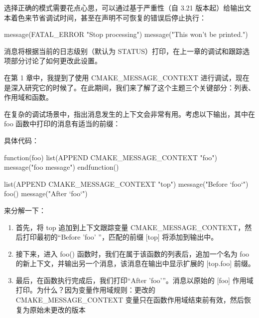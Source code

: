 选择正确的模式需要花点心思，可以通过基于严重性（自 3.21 版本起）给输出文本着色来节省调试时间，甚至在声明不可恢复的错误后停止执行：


\begin{cmake}
message(FATAL_ERROR "Stop processing")
message("This won't be printed.")
\end{cmake}

消息将根据当前的日志级别（默认为 STATUS）打印，在上一章的调试和跟踪选项部分讨论了如何更改此设置。

在第 1 章中，我提到了使用 CMAKE\_MESSAGE\_CONTEXT 进行调试，现在是深入研究它的时候了。在此期间，我们来了解了这个主题三个关键部分：列表、作用域和函数。

在复杂的调试场景中，指出消息发生的上下文会非常有用。考虑以下输出，其中在 foo 函数中打印的消息有适当的前缀：


具体代码：


\begin{cmake}
function(foo)
    list(APPEND CMAKE_MESSAGE_CONTEXT "foo")
    message("foo message")
endfunction()

list(APPEND CMAKE_MESSAGE_CONTEXT "top")
message("Before `foo`")
foo()
message("After `foo`")
\end{cmake}

来分解一下：

\begin{enumerate}
\item
首先，将 top 追加到上下文跟踪变量 CMAKE\_MESSAGE\_CONTEXT，然后打印最初的“Before 'foo' ”，匹配的前缀 [top] 将添加到输出中。

\item
接下来，进入 foo() 函数时，我们在属于该函数的列表后，追加一个名为 foo 的新上下文，并输出另一个消息，该消息在输出中显示扩展的 [top.foo] 前缀。

\item
最后，在函数执行完成后，我们打印“After 'foo'”。消息以原始的 [foo] 作用域打印。为什么？因为变量作用域规则：更改的 CMAKE\_MESSAGE\_CONTEXT 变量只在函数作用域结束前有效，然后恢复为原始未更改的版本
\end{enumerate}

